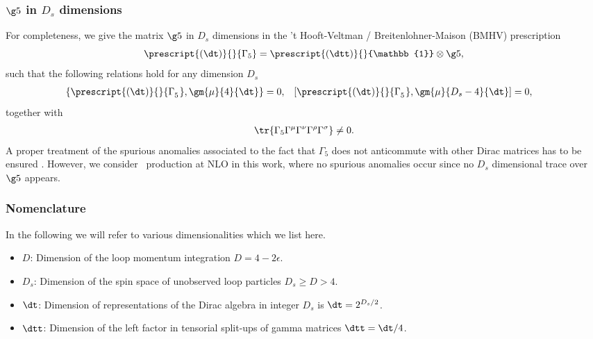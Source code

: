 \subsubsection{\texorpdfstring{$\g5$}{g5} in \texorpdfstring{$D_s$}{Ds} dimensions}
\label{subsec:g5}
For completeness, we give the matrix $\g5$ in $D_s$ dimensions in the
't Hooft-Veltman \cite{tHooft:1972tcz} / Breitenlohner-Maison
\cite{Breitenlohner:1977hr} (BMHV) prescription
  \begin{equation}
    \prescript{(\dt)}{}{\Gamma_{5}} = \prescript{(\dtt)}{}{\mathbb{1}} \otimes  \g5,
  \end{equation}
such that the following relations hold for any dimension $D_s$
  \begin{align}
    \left\{\prescript{(\dt)}{}{\Gamma^{\phantom{\mu}}_{5}},\gm{\mu}{4}{\dt}\right\}
    &= 0,  &   \left[\prescript{(\dt)}{}{\Gamma^{\phantom{\mu}}_{5}},\gm{\mu}{D_s-4}{\dt}\right]&=0,
  \end{align}
together with 
\begin{align}\label{eq:traceg5}
  \tr{\Gamma_{5} \Gamma^\mu \Gamma^\nu \Gamma^\rho \Gamma^\sigma} \neq 0.
\end{align}
A proper
treatment of the spurious anomalies associated to the fact that $\Gamma_5$
does not anticommute with other Dirac matrices has to be ensured
\cite{Larin:1993tq}. However, we consider
\Wbb~production at NLO in this work, where no spurious anomalies occur since no $D_s$ dimensional trace over $\g5$ appears. 

\subsubsection{Nomenclature}
\label{sec:nomencl-dimens}
In the following we will refer to various dimensionalities which we
list here.
\begin{itemize}
\item $D$: Dimension of the loop momentum integration $D=4-2\epsilon$.
\item $D_s$: Dimension of the spin space of unobserved loop particles
  $D_s\geq D>4$.
\item $\dt$: Dimension of representations of the Dirac algebra
  in integer $D_s$ is $\dt=2^{D_s/2}$.
\item $\dtt$: Dimension of the left factor in tensorial
  split-ups of gamma matrices $\dtt=\dt/4$.
\end{itemize}

